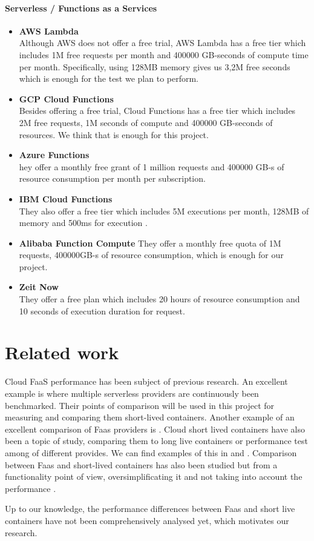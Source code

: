 \documentclass[11pt]{article}
\begin{document}
\paragraph{Serverless / Functions as a Services}
\begin{itemize}
\item \textbf{AWS Lambda} \\
Although AWS does not offer a free trial, AWS Lambda has a free tier which includes 1M free requests per month and 400000 GB-seconds of compute time per month. Specifically, using 128MB memory gives us  3,2M free seconds which is enough for the test we plan to perform.

\item \textbf{GCP Cloud Functions} \\
Besides offering a free trial, Cloud Functions has a free tier which includes 2M free requests, 1M seconds of compute and 400000 GB-seconds of resources. We think that is enough for this project. 

\item \textbf{Azure Functions}\\ 
hey offer a monthly free grant of 1 million requests and 400000 GB-s of resource consumption per month per subscription.

\item \textbf{IBM Cloud Functions} \\
They also offer a free tier which includes 5M executions per month, 128MB of memory and 500ms for execution . 

\item \textbf{Alibaba Function Compute} 
They offer a monthly free quota of 1M requests, 400000GB-s of resource consumption, which is enough for our project.

\item \textbf{Zeit Now} \\
They offer a free plan which includes 20 hours of resource consumption and 10 seconds of execution duration for request.

\end{itemize}

\section{Related work}
Cloud FaaS performance has been subject of previous research. An excellent example is \cite{aa} where multiple serverless providers are continuously been benchmarked. Their points of comparison will be used in this project for measuring and comparing them short-lived containers. Another example of an excellent comparison of Faas providers is \cite{bb}. Cloud short lived containers have also been a topic of study, comparing them to long live containers or performance test among of different provides. We can find examples of this in \cite{cc} and \cite{dd}. Comparison between Faas and short-lived containers has also been studied but from a functionality point of view, oversimplificating it and not taking into account the performance \cite{ee}\cite{ff}\cite{gg}.

Up to our knowledge, the performance differences between Faas and short live containers have not been comprehensively analysed yet, which motivates our research. 



\end{document}
